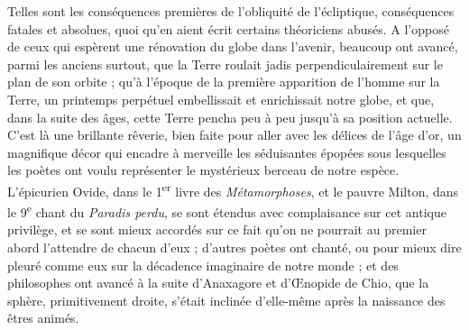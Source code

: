 \documentclass[a4paper, 11pt, oneside, landscape]{article}
\begin{document}
Telles sont les conséquences premières de l'obliquité de l'écliptique, conséquences fatales et absolues, quoi qu'en aient écrit certains théoriciens abusés. A l'opposé de ceux qui espèrent une rénovation du globe dans l'avenir, beaucoup ont avancé, parmi les anciens surtout, que la Terre roulait jadis perpendiculairement sur le plan de son orbite ; qu'à l'époque de la première apparition de l'homme sur la Terre, un printemps perpétuel embellissait et enrichissait notre globe, et que, dans la suite des âges, cette Terre pencha peu à peu jusqu'à sa position actuelle. C'est là une brillante rêverie, bien faite pour aller avec les délices de l'âge d'or, un magnifique décor qui encadre à merveille les séduisantes épopées sous lesquelles les poètes ont voulu représenter le mystérieux berceau de notre espèce. L'épicurien Ovide, dans le 1\textsuperscript{er} livre des \emph{Métamorphoses}, et le pauvre Milton, dans le 9\textsuperscript{e} chant du \emph{Paradis perdu}, se sont étendus avec complaisance sur cet antique privilège, et se sont mieux accordés sur ce fait qu'on ne pourrait au premier abord l'attendre de chacun d'eux ; d'autres poètes ont chanté, ou pour mieux dire pleuré comme eux sur la décadence imaginaire de notre monde ; et des philosophes ont avancé à la suite d'Anaxagore et d'Œnopide de Chio, que la sphère, primitivement droite, s'était inclinée d'elle-même après la naissance des êtres animés.
\end{document}
